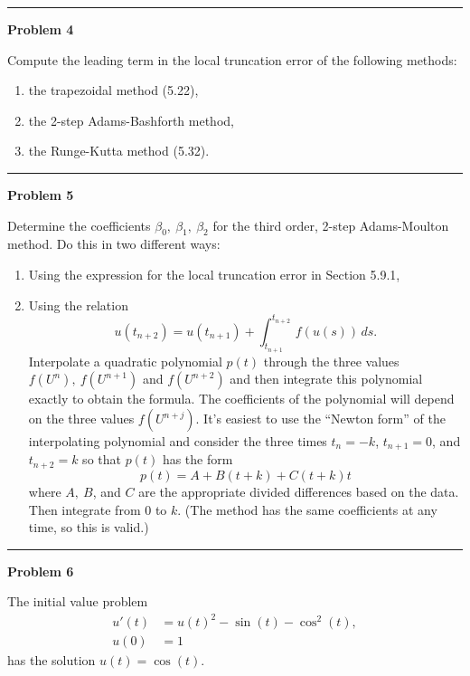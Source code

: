 \documentclass[10pt]{article}
\begin{document}
\vskip 1cm
\hrule
{\bf Problem 4}

Compute the leading term in the local truncation error of the following
methods:
\begin{enumerate}
\item the trapezoidal method (5.22),
\item the 2-step Adams-Bashforth method,
\item the Runge-Kutta method (5.32).
\end{enumerate} 





\vskip 1cm
\hrule
{\bf Problem 5}

Determine the coefficients $\beta_0,~\beta_1,~\beta_2$ for the third
order, 2-step Adams-Moulton method.  Do this in two different ways:
\begin{enumerate} 
 \item Using the expression for the local truncation error in Section 5.9.1,
 \item Using the relation
 \[
 u(t_{n+2}) = u(t_{n+1}) + \int_{t_{n+1}}^{t_{n+2}}\,f(u(s))\,ds.
 \]
 Interpolate  a quadratic polynomial $p(t)$ through the three values
 $f(U^n),~f(U^{n+1})$ and $f(U^{n+2})$ and then integrate this polynomial
 exactly to obtain the formula.  The coefficients of the polynomial will
 depend on the three values $f(U^{n+j})$.   It's easiest to use the
 ``Newton form'' of the interpolating polynomial and consider the three
times $t_n=-k$, $t_{n+1}=0$, and $t_{n+2}=k$ so that $p(t)$ has the form
\[
p(t) = A + B(t+k) + C(t+k)t
\]
where $A,~B$, and $C$ are the appropriate divided differences based on the
data.  Then integrate from $0$ to $k$.   (The method has the same
coefficients at any time, so this is valid.)
\end{enumerate}




\vskip 1cm
\hrule
{\bf Problem 6}

The initial value problem 
\begin{equation}\label{ode1}
\begin{split}
u'(t) &= u(t)^2 - \sin(t) - \cos^2(t),\\
u(0) &= 1
\end{split}
\end{equation}
has the solution $u(t) = \cos(t)$. 
\end{document}
